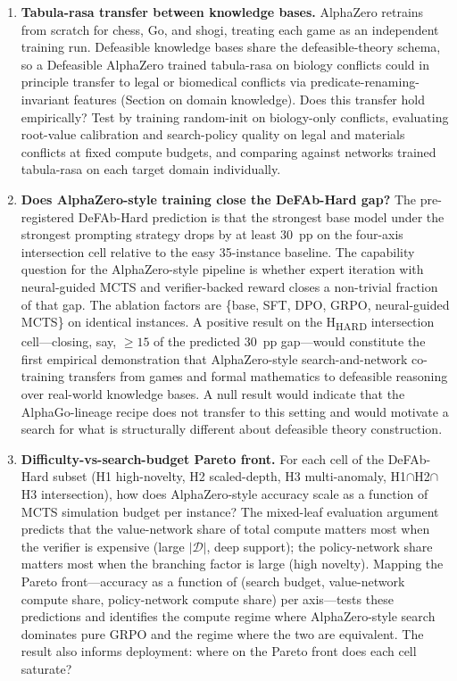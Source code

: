 \documentclass{article}
\newcommand{\D}{\mathcal{D}}
\begin{document}
\begin{enumerate}
    \item \textbf{Tabula-rasa transfer between knowledge bases.} AlphaZero retrains from scratch for chess, Go, and shogi, treating each game as an independent training run. Defeasible knowledge bases share the defeasible-theory schema, so a Defeasible AlphaZero trained tabula-rasa on biology conflicts could in principle transfer to legal or biomedical conflicts via predicate-renaming-invariant features (Section on domain knowledge). Does this transfer hold empirically? Test by training random-init on biology-only conflicts, evaluating root-value calibration and search-policy quality on legal and materials conflicts at fixed compute budgets, and comparing against networks trained tabula-rasa on each target domain individually.
    \item \textbf{Does AlphaZero-style training close the DeFAb-Hard gap?} The pre-registered DeFAb-Hard prediction is that the strongest base model under the strongest prompting strategy drops by at least 30~pp on the four-axis intersection cell relative to the easy 35-instance baseline. The capability question for the AlphaZero-style pipeline is whether expert iteration with neural-guided MCTS and verifier-backed reward closes a non-trivial fraction of that gap. The ablation factors are \{base, SFT, DPO, GRPO, neural-guided MCTS\} on identical instances. A positive result on the H\textsubscript{HARD} intersection cell---closing, say, $\geq 15$ of the predicted 30~pp gap---would constitute the first empirical demonstration that AlphaZero-style search-and-network co-training transfers from games and formal mathematics to defeasible reasoning over real-world knowledge bases. A null result would indicate that the AlphaGo-lineage recipe does not transfer to this setting and would motivate a search for what is structurally different about defeasible theory construction.
    \item \textbf{Difficulty-vs-search-budget Pareto front.} For each cell of the DeFAb-Hard subset (H1 high-novelty, H2 scaled-depth, H3 multi-anomaly, H1$\cap$H2$\cap$H3 intersection), how does AlphaZero-style accuracy scale as a function of MCTS simulation budget per instance? The mixed-leaf evaluation argument predicts that the value-network share of total compute matters most when the verifier is expensive (large $|\D|$, deep support); the policy-network share matters most when the branching factor is large (high novelty). Mapping the Pareto front---accuracy as a function of (search budget, value-network compute share, policy-network compute share) per axis---tests these predictions and identifies the compute regime where AlphaZero-style search dominates pure GRPO and the regime where the two are equivalent. The result also informs deployment: where on the Pareto front does each cell saturate?
\end{enumerate}
\end{document}
